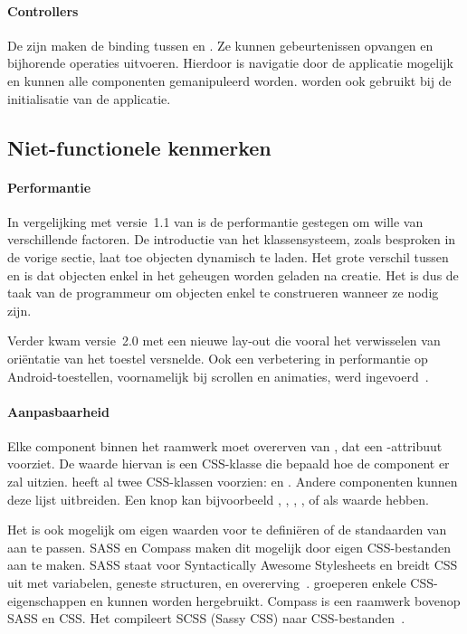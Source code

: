 \paragraph{Controllers} 
De  zijn maken de binding tussen  en .
Ze kunnen gebeurtenissen opvangen en bijhorende operaties uitvoeren.
Hierdoor is navigatie door de applicatie mogelijk en kunnen alle componenten gemanipuleerd worden.
 worden ook gebruikt bij de initialisatie van de applicatie.

\subsection{Niet-functionele kenmerken}
\paragraph{Performantie}
In vergelijking met versie~1.1 van \st{} is de performantie gestegen om wille van verschillende factoren.  
De introductie van het klassensysteem,  zoals besproken in de vorige sectie,  laat toe objecten dynamisch te laden. 
Het grote verschil tussen  en  is dat objecten enkel in het geheugen worden geladen na creatie.  
Het is dus de taak van de programmeur om objecten enkel te construeren wanneer ze nodig zijn.

Verder kwam versie~2.0 met een nieuwe lay-out  die vooral het verwisselen van oriëntatie van het toestel versnelde.  
Ook een verbetering in performantie op Android-toestellen,  voornamelijk bij scrollen en animaties,  werd ingevoerd~\cite{Inc.}.

\paragraph{Aanpasbaarheid}
\label{sec:sencha-aanpasbaarheid}
Elke component binnen het raamwerk moet overerven van , dat een -attribuut voorziet.  
De waarde hiervan is een CSS-klasse die bepaald hoe de component er zal uitzien.  
\st{} heeft al twee CSS-klassen voorzien:   en .  
Andere componenten kunnen deze lijst uitbreiden.  
Een knop kan bijvoorbeeld ,  ,  ,  ,   of  als  waarde hebben.

Het is ook mogelijk om eigen waarden voor  te definiëren of de standaarden van \st{} aan te passen.  
SASS en Compass maken dit mogelijk door eigen CSS-bestanden aan te maken.  
SASS staat voor Syntactically Awesome Stylesheets en breidt CSS uit met variabelen,  geneste structuren,  en overerving~\cite{Eppstein2013}.  
 groeperen enkele CSS-eigenschappen en kunnen worden hergebruikt.  
Compass is een raamwerk bovenop SASS en CSS.  
Het compileert SCSS (Sassy CSS) naar CSS-bestanden~\cite{Eppstein2013a}.        


